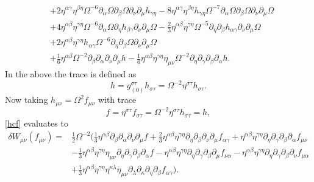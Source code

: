 \documentclass[10pt,letterpaper]{article}
\begin{document}
\begin{align}
& + 2 \eta^{\alpha \gamma} \eta^{\beta \eta} \Omega^{-6} \partial_{\alpha}\Omega \partial_{\beta}\Omega \partial_{\nu}\partial_{\mu}h_{\gamma \eta}
 - 8 \eta^{\alpha \gamma} \eta^{\beta \eta} h_{\gamma \eta} \Omega^{-7} \partial_{\alpha}\Omega \partial_{\beta}\Omega \partial_{\nu}\partial_{\mu}\Omega\nonumber\\
& + 4 \eta^{\alpha \beta} \eta^{\gamma \eta} \Omega^{-6} \partial_{\alpha}\Omega \partial_{\eta}h_{\beta \gamma} \partial_{\nu}\partial_{\mu}\Omega
 -  \tfrac{2}{3} \eta^{\alpha \beta} \eta^{\gamma \eta} \Omega^{-5} \partial_{\eta}\partial_{\beta}h_{\alpha \gamma} \partial_{\nu}\partial_{\mu}\Omega\nonumber\\
& + 2 \eta^{\alpha \beta} \eta^{\gamma \eta} h_{\alpha \gamma} \Omega^{-6} \partial_{\eta}\partial_{\beta}\Omega \partial_{\nu}\partial_{\mu}\Omega\nonumber\\
& + \tfrac{1}{6} \eta^{\alpha \beta} \Omega^{-2} \partial_{\beta}\partial_{\alpha}\partial_{\nu}\partial_{\mu}h -  \tfrac{1}{6} \eta^{\alpha \beta} \eta^{\gamma \eta} \eta_{\mu \nu} \Omega^{-2} \partial_{\eta}\partial_{\gamma}\partial_{\beta}\partial_{\alpha}h.\label{hcf}
\end{align}
In the above the trace is defined as
\begin{equation}
h = g^{\sigma\tau}_{(0)} h_{\sigma\tau} = \Omega^{-2} \eta^{\sigma\tau} h_{\sigma\tau}.
\end{equation}
Now taking $h_{\mu\nu} = \Omega^{2}f_{\mu\nu}$ with trace
\begin{equation}
f = \eta^{\sigma\tau}f_{\sigma\tau} = \Omega^{-2}\eta^{\sigma\tau} h_{\sigma\tau} = h,
\end{equation}
\eqref{hcf} evaluates to
\begin{align}
\delta W_{\mu\nu}(f_{\mu\nu})={}&\frac{1}{2}\Omega^{-2}  \bigg(\frac{1}{3} \eta^{\alpha \beta} \partial_{\beta}\partial_{\alpha}\partial_{\nu}\partial_{\mu}f
 + \frac{2}{3} \eta^{\alpha \beta} \eta^{\gamma \eta} \partial_{\eta}\partial_{\beta}\partial_{\nu}\partial_{\mu}f_{\alpha \gamma}
 + \eta^{\alpha \beta} \eta^{\gamma \eta}  \partial_{\eta}\partial_{\gamma}\partial_{\beta}\partial_{\alpha}f_{\mu \nu}\nonumber\\
& -  \frac{1}{3} \eta^{\alpha \beta} \eta^{\gamma \eta} \eta_{\mu \nu} \partial_{\eta}\partial_{\gamma}\partial_{\beta}\partial_{\alpha}f
 -  \eta^{\alpha \beta} \eta^{\gamma \eta}  \partial_{\eta}\partial_{\gamma}\partial_{\beta}\partial_{\mu}f_{\nu \alpha}
 -  \eta^{\alpha \beta} \eta^{\gamma \eta}  \partial_{\eta}\partial_{\gamma}\partial_{\beta}\partial_{\nu}f_{\mu \alpha}\nonumber\\
& + \frac{1}{3} \eta^{\alpha \beta} \eta^{\gamma \eta} \eta^{\kappa \lambda} \eta_{\mu \nu}  \partial_{\lambda}\partial_{\kappa}\partial_{\eta}\partial_{\beta}f_{\alpha \gamma}\bigg).
\end{align}
\\ \\
\end{document}
